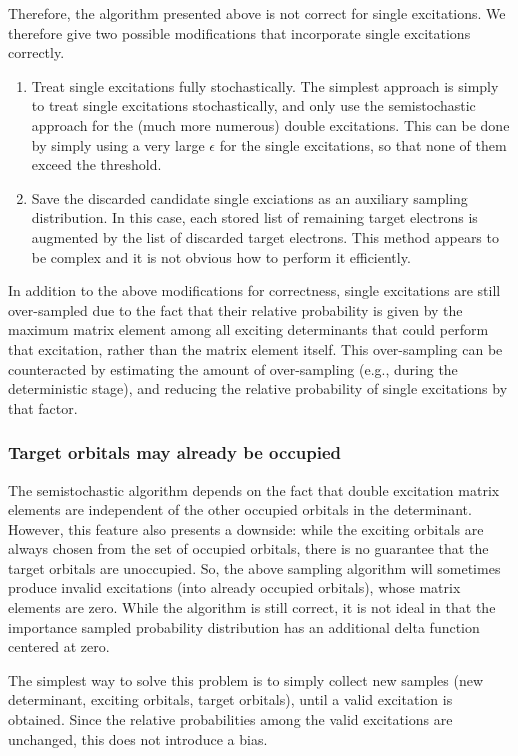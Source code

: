 \documentclass[english]{article}
\begin{document}
Therefore, the algorithm presented above is not correct for single excitations. We therefore give two possible modifications that incorporate single excitations correctly.
\begin{enumerate}
	\item Treat single excitations fully stochastically. The simplest approach is simply to treat single excitations stochastically, and only use the semistochastic approach for the (much more numerous) double excitations. This can be done by simply using a very large $\epsilon$ for the single excitations, so that none of them exceed the threshold.
	\item Save the discarded candidate single exciations as an auxiliary sampling distribution. In this case, each stored list of remaining target electrons is augmented by the list of discarded target electrons. This method appears to be complex and it is not obvious how to perform it efficiently.
\end{enumerate}

In addition to the above modifications for correctness, single excitations are still over-sampled due to the fact that their relative probability is given by the maximum matrix element among all exciting determinants that could perform that excitation, rather than the matrix element itself. This over-sampling can be counteracted by estimating the amount of over-sampling (e.g., during the deterministic stage), and reducing the relative probability of single excitations by that factor.

\subsubsection{Target orbitals may already be occupied}
The semistochastic algorithm depends on the fact that double excitation matrix elements are independent of the other occupied orbitals in the determinant. However, this feature also presents a downside: while the exciting orbitals are always chosen from the set of occupied orbitals, there is no guarantee that the target orbitals are unoccupied. So, the above sampling algorithm will sometimes produce invalid excitations (into already occupied orbitals), whose matrix elements are zero. While the algorithm is still correct, it is not ideal in that the importance sampled probability distribution has an additional delta function centered at zero.

The simplest way to solve this problem is to simply collect new samples (new determinant, exciting orbitals, target orbitals), until a valid excitation is obtained. Since the relative probabilities among the valid excitations are unchanged, this does not introduce a bias.
\end{document}
